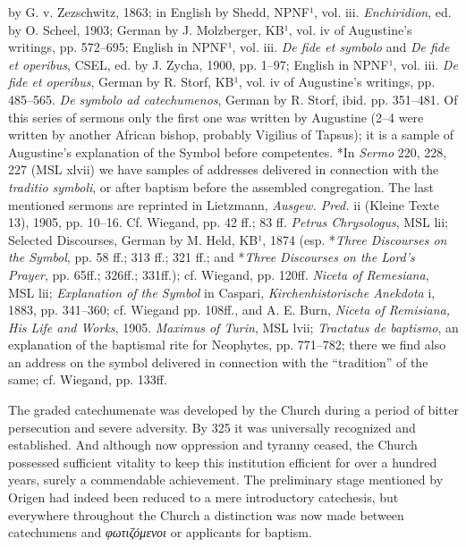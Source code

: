 by G. v. Zezschwitz, 1863; in English by Shedd, NPNF¹, vol. iii. \emph{Enchiridion}, ed. by O. Scheel, 1903; German by J. Molzberger, KB¹, vol. iv of Augustine’s writings, pp. 572–695; English in NPNF¹, vol. iii. \emph{De fide et symbolo} and \emph{De fide et operibus}, CSEL, ed. by J. Zycha, 1900, pp. 1–97; English in NPNF¹, vol. iii. \emph{De fide et operibus}, German by R. Storf, KB¹, vol. iv of Augustine’s writings, pp. 485–565. \emph{De symbolo ad catechumenos}, German by R. Storf, ibid. pp. 351–481. Of this series of sermons only the first one was written by Augustine (2–4 were written by another African bishop, probably Vigilius of Tapsus); it is a sample of Augustine’s explanation of the Symbol before competentes. *In \emph{Sermo} 220, 228, 227 (MSL xlvii) we have samples of addresses delivered in connection with the \emph{traditio symboli}, or after baptism before the assembled congregation. The last mentioned sermons are reprinted in Lietzmann, \emph{Ausgew. Pred.} ii (Kleine Texte 13), 1905, pp. 10–16. Cf. Wiegand, pp. 42 ff.; 83 ff. \emph{Petrus Chrysologus}, MSL lii; Selected Discourses, German by M. Held, KB¹, 1874 (esp. *\emph{Three Discourses on the Symbol}, pp. 58 ff.; 313 ff.; 321 ff.; and *\emph{Three Discourses on the Lord’s Prayer}, pp. 65ff.; 326ff.; 331ff.); cf. Wiegand, pp. 120ff. \emph{Niceta of Remesiana}, MSL lii; \emph{Explanation of the Symbol} in Caspari, \emph{Kirchenhistorische Anekdota} i, 1883, pp. 341–360; cf. Wiegand pp. 108ff., and A. E. Burn, \emph{Niceta of Remisiana, His Life and Works}, 1905. \emph{Maximus of Turin}, MSL lvii; \emph{Tractatus de baptismo}, an explanation of the baptismal rite for Neophytes, pp. 771–782; there we find also an address on the symbol delivered in connection with the “tradition” of the same; cf. Wiegand, pp. 133ff.

The graded catechumenate was developed by the Church during a period of bitter persecution and severe adversity. By 325 it was universally recognized and established. And although now oppression and tyranny ceased, the Church possessed sufficient vitality to keep this institution efficient for over a hundred years, surely a commendable achievement. The preliminary stage mentioned by Origen had indeed been reduced to a mere introductory catechesis, but everywhere throughout the Church a distinction was now made between catechumens and \emph{φωτιζόμενοι} or applicants for baptism.

